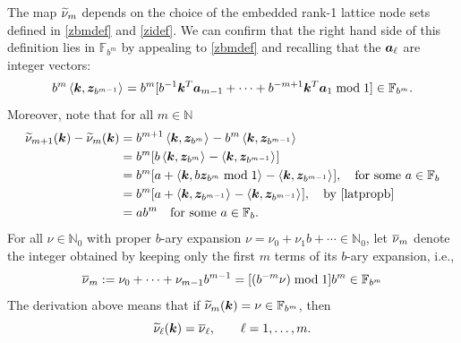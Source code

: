 \documentclass[graybox]{svmult}
\newcommand{\N}{\mathbb{N}} %
\newcommand{\F}{\mathbb{F}} %
\newcommand{\bsz}{\boldsymbol{z}}    %
\begin{document}
The map $\widetilde{\nu}_m$ depends on the choice of the embedded rank-1 lattice node sets defined in \eqref{zbmdef} and \eqref{zidef}.  We can confirm that the right hand side of this definition lies in $\F_{b^m}$ by appealing to  \eqref{zbmdef} and recalling that the $\boldsymbol{a}_\ell$ are integer vectors:
\[
b^{m} \ip{\bsk}{\bsz_{b^{m-1}}} = b^m[b^{-1} \bsk^T\bsa_{m-1} + \cdots + b^{-m+1}\bsk^T \bsa_{1} \bmod 1] \in \F_{b^m}.
\]
Moreover, note that for all $m\in \N$
\begin{align*}
\tnu_{m+1}(\bsk) - \tnu_{m}(\bsk) & = b^{m+1} \ip{\bsk}{\bsz_{b^{m}}} - b^{m} \ip{\bsk}{\bsz_{b^{m-1}}} \\
&=b^{m}[ b\ip{\bsk}{\bsz_{b^{m}}} - \ip{\bsk}{\bsz_{b^{m-1}}}]\\
&=b^{m}[ a + \ip{\bsk}{b\bsz_{b^{m}} \bmod 1}  - \ip{\bsk}{\bsz_{b^{m-1}}}], \quad \text{for some }a \in \F_b \\
&=b^{m}[ a + \ip{\bsk}{\bsz_{b^{m-1}}}  - \ip{\bsk}{\bsz_{b^{m-1}}}], \quad  \text{by \eqref{latpropb}} \\
&=a b^{m} \quad \text{for some }a \in \F_b.
\end{align*}
For all $\nu\in \N_0$ with proper $b$-ary expansion $\nu= \nu_0 + \nu_1 b + \cdots \in \N_0$, let $\overline{\nu}_{m}$ denote the integer obtained by keeping only the first $m$ terms of its $b$-ary expansion, i.e., 
\begin{equation}
\label{onudef}
\onu_{m} := \nu_0 + \cdots + \nu_{m-1}b^{m-1} = [(b^{-m} \nu) \bmod 1] b^{m} \in \F_{b^{m}}
\end{equation}
The derivation above means that if $\tnu_{m}(\bsk) = \nu \in \F_{b^m}$, then
\[
\widetilde{\nu}_\ell(\boldsymbol{k})=\overline{\nu}_{\ell}, \qquad \ell=1, \ldots, m.
\] 
\end{document}
